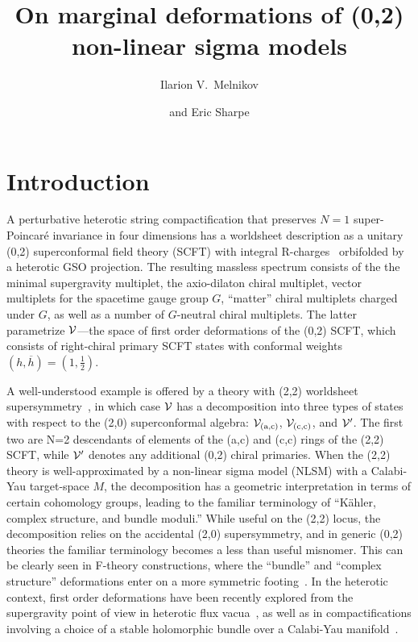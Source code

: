 \documentclass[11pt, a4paper]{article}
\title{On marginal deformations of (0,2) non-linear sigma models}
\author[a] {Ilarion V.~Melnikov}
\author[b] {and Eric Sharpe}
\affiliation[a]{Max-Planck-Institut f\"ur Gravitationsphysik (Albert-Einstein-Institut)\\
 Am M\"uhlenberg 1, D-14476 Golm, Germany}
\affiliation[b]{Physics Department\\ Virginia Tech \\ Blacksburg, VA 24061, USA}
\def\half{\frac{1}{2}}
\def\cV{{\cal V}}
\newcommand\hb{\overline{h}}
\def\tac{{{\text{(a,c)}}}}
\def\tcc{{{\text{(c,c)}}}}
\begin{document}
\maketitle

\section{Introduction}
A perturbative heterotic string compactification that preserves $N=1$ super-Poincar\'e
invariance in four dimensions has a worldsheet description as a 
unitary (0,2) superconformal field theory (SCFT) with integral R-charges~\cite{Banks:1987cy} orbifolded by a heterotic GSO projection.  The resulting massless spectrum consists of the the minimal supergravity multiplet, the axio-dilaton chiral multiplet, 
vector multiplets for the spacetime gauge group $G$, ``matter'' chiral multiplets 
charged under $G$, as well as a number of $G$-neutral chiral multiplets.  The latter parametrize  $\cV$---the space of first order deformations of the (0,2) SCFT, which consists of right-chiral primary SCFT states with  conformal weights $(h,\hb) = (1,\half)$. 

A well-understood example is offered by a theory with (2,2)
worldsheet supersymmetry~\cite{Green:1987sp,Polchinski:1998rr}, in which case
 $\cV$ has a decomposition into three types of states
with respect to the (2,0) superconformal algebra:  $\cV_\tac$, $\cV_\tcc$,
and $\cV'$.  The first two are N=2 descendants of elements
of the (a,c) and (c,c) rings of the (2,2) SCFT, while $\cV'$ denotes any
additional (0,2) chiral primaries.  When the (2,2) theory is well-approximated
by a non-linear sigma model (NLSM) with a Calabi-Yau target-space $M$, the decomposition has a geometric interpretation in terms
of certain cohomology groups,   
leading to the familiar terminology of ``K\"ahler, complex structure, and bundle moduli.''
While useful on the (2,2) locus, the decomposition relies on
the accidental (2,0) supersymmetry, and in generic (0,2) theories the familiar
terminology becomes a less than useful misnomer.  This can be clearly seen in
F-theory constructions, where the ``bundle'' and ``complex structure'' deformations
enter on a more symmetric footing~\cite{Donagi:2009ra}.  In the heterotic context, first
order deformations  have been recently explored from the supergravity point of 
view in heterotic flux vacua~\cite{Becker:2006xp},  as well as in compactifications
involving a choice of a stable holomorphic bundle over a Calabi-Yau 
manifold~\cite{Anderson:2011ty}.
\end{document}
